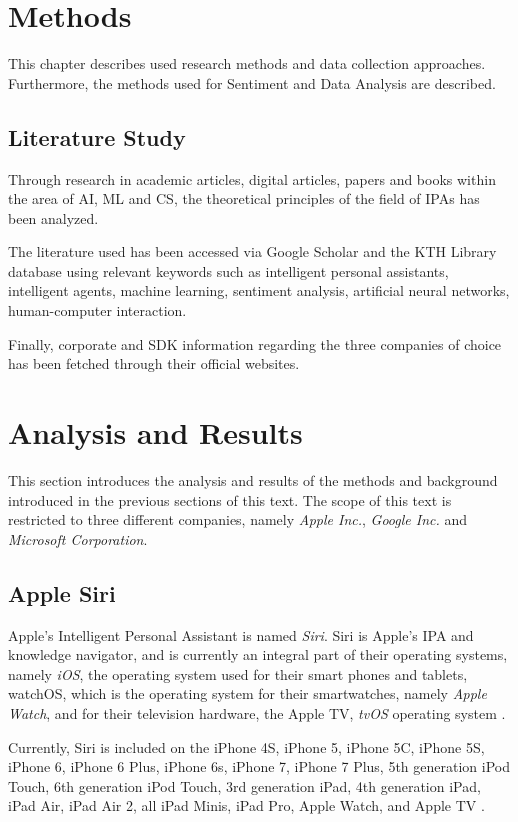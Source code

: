 \documentclass[preprint,12pt]{elsarticle}
\begin{document}
\newpage
\section{Methods}
This chapter describes used research methods and data collection approaches. Furthermore, the methods used for Sentiment and Data Analysis are described. 

\subsection{Literature Study}
Through research in academic articles, digital articles, papers and books within the area of AI, ML and CS, the theoretical principles of the field of IPAs has been analyzed. 

The literature used has been accessed via Google Scholar and the KTH Library database using relevant keywords such as intelligent personal assistants, intelligent agents, machine learning, sentiment analysis, artificial neural networks, human-computer interaction. 

Finally, corporate and SDK information regarding the three companies of choice has been fetched through their official websites.

\section{Analysis and Results}
This section introduces the analysis and results of the methods and background introduced in the previous sections of this text. The scope of this text is restricted to three different companies, namely \textit{Apple Inc.}, \textit{Google Inc.} and \textit{Microsoft Corporation}.

\subsection{Apple Siri}
Apple's Intelligent Personal Assistant is named \textit{Siri}. Siri is Apple's IPA and knowledge navigator, and is currently an integral part of their operating systems, namely \textit{iOS}, the operating system used for their smart phones and tablets, watchOS, which is the operating system for their smartwatches, namely \textit{Apple Watch}, and for their television hardware, the Apple TV, \textit{tvOS} operating system \cite{applesiri2016}.

Currently, Siri is included on the iPhone 4S, iPhone 5, iPhone 5C, iPhone 5S, iPhone 6, iPhone 6 Plus, iPhone 6s, iPhone 7, iPhone 7 Plus, 5th generation iPod Touch, 6th generation iPod Touch, 3rd generation iPad, 4th generation iPad, iPad Air, iPad Air 2, all iPad Minis, iPad Pro, Apple Watch, and Apple TV \cite{applesiri2016}.
\end{document}
